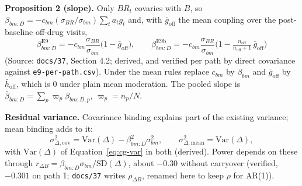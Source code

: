 \documentclass[11pt]{article}
\newcommand{\code}[1]{\texttt{#1}}
\begin{document}
\textbf{Proposition 2 (slope).} Only $BR_t$ covaries with $B$, so
$\beta_{bm:D} = -c_{bm}(\sigma_{BR}/\sigma_{bm})\sum_t a_t g_t$ and,
with $\bar g_{\mathrm{off}}$ the mean coupling over the post-baseline
off-drug visits,
\begin{equation}
\beta_{bm:D}^{\mathrm{E9}} = -c_{bm}\frac{\sigma_{BR}}{\sigma_{bm}}
  \big(1 - \bar g_{\mathrm{off}}\big), \qquad
\beta_{bm:D}^{\mathrm{E9b}} = -c_{bm}\frac{\sigma_{BR}}{\sigma_{bm}}
  \Big(1 - \tfrac{n_{\mathrm{off}}}{n_{\mathrm{off}}+1}\,
  \bar g_{\mathrm{off}}\Big)
\label{eq:cg-slope}
\end{equation}
(Source: \code{docs/37}, Section 4.2; derived, and verified per path by
direct covariance against \code{e9-per-path.csv}). Under the mean rules
replace $c_{bm}$ by $\beta_{bm}$ and $\bar g_{\mathrm{off}}$ by
$\bar h_{\mathrm{off}}$, which is $0$ under plain mean moderation. The
pooled slope is $\bar\beta_{bm:D} = \sum_p \varpi_p \beta_{bm:D,p}$,
$\varpi_p = n_p/N$.

\textbf{Residual variance.} Covariance binding explains part of the
existing variance; mean binding adds to it:
\begin{equation}
\sigma^2_{\Delta,\mathrm{cov}} = \mathrm{Var}(\Delta) - \beta_{bm:D}^2\sigma_{bm}^2,
\qquad \sigma^2_{\Delta,\mathrm{mean}} = \mathrm{Var}(\Delta),
\label{eq:cg-tau}
\end{equation}
with $\mathrm{Var}(\Delta)$ of Equation~\eqref{eq:cg-var} in both
(derived). Power depends on these through
$r_{\Delta B} = \beta_{bm:D}\sigma_{bm}/\mathrm{SD}(\Delta)$, about
$-0.30$ without carryover (verified, $-0.301$ on path 1;
\code{docs/37} writes $\rho_{\Delta B}$, renamed here to keep $\rho$
for AR(1)).
\end{document}
